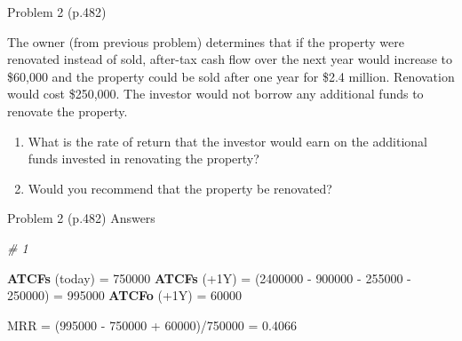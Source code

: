 \documentclass[ignorenonframetext,]{beamer}
\newenvironment{Shaded}{\begin{snugshade}}{\end{snugshade}}
\newcommand{\KeywordTok}[1]{\textcolor[rgb]{0.13,0.29,0.53}{\textbf{{#1}}}}
\newcommand{\DecValTok}[1]{\textcolor[rgb]{0.00,0.00,0.81}{{#1}}}
\newcommand{\FloatTok}[1]{\textcolor[rgb]{0.00,0.00,0.81}{{#1}}}
\newcommand{\StringTok}[1]{\textcolor[rgb]{0.31,0.60,0.02}{{#1}}}
\newcommand{\CommentTok}[1]{\textcolor[rgb]{0.56,0.35,0.01}{\textit{{#1}}}}
\newcommand{\NormalTok}[1]{{#1}}
\providecommand{\tightlist}{%
\setlength{\itemsep}{0pt}\setlength{\parskip}{0pt}}
\begin{document}
\begin{frame}{Problem 2 (p.482)}

\small

The owner (from previous problem) determines that if the property were
renovated instead of sold, after-tax cash flow over the next year would
increase to \$60,000 and the property could be sold after one year for
\$2.4 million. Renovation would cost \$250,000. The investor would not
borrow any additional funds to renovate the property.

\begin{enumerate}
\def\labelenumi{\arabic{enumi}.}
\tightlist
\item
  What is the rate of return that the investor would earn on the
  additional funds invested in renovating the property?
\item
  Would you recommend that the property be renovated?
\end{enumerate}

\end{frame}

\begin{frame}[fragile]{Problem 2 (p.482) Answers}

\footnotesize

\begin{Shaded}
\begin{Highlighting}[]
\CommentTok{# 1 }

\KeywordTok{ATCFs} \NormalTok{(today) =}\StringTok{ }\DecValTok{750000}
\KeywordTok{ATCFs} \NormalTok{(+1Y) =}\StringTok{ }\NormalTok{(}\DecValTok{2400000} \NormalTok{-}\StringTok{ }\DecValTok{900000} \NormalTok{-}\StringTok{ }\DecValTok{255000} \NormalTok{-}\StringTok{ }\DecValTok{250000}\NormalTok{) }
  \NormalTok{=}\StringTok{ }\DecValTok{995000}
\KeywordTok{ATCFo} \NormalTok{(+1Y) =}\StringTok{ }\DecValTok{60000}

\NormalTok{MRR =}\StringTok{ }
\NormalTok{(}\DecValTok{995000} \NormalTok{-}\StringTok{ }\DecValTok{750000} \NormalTok{+}\StringTok{ }\DecValTok{60000}\NormalTok{)/}\DecValTok{750000} \NormalTok{=}\StringTok{ }\FloatTok{0.4066}
\end{Highlighting}
\end{Shaded}

\normalsize

\end{frame}
\end{document}
